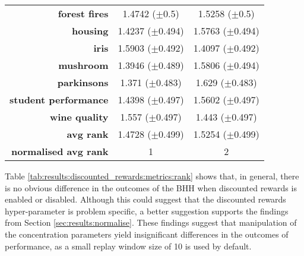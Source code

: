 \begin{table}[htb]
{\begin{tabular}{rcc}
                  \multicolumn{1}{r|}{\textbf{forest fires}}        & \cellcolor[rgb]{ .388,  .745,  .482}1.4742 ($\pm$0.5)          & \cellcolor[rgb]{ .973,  .412,  .42}1.5258 ($\pm$0.5)    \\
                  \multicolumn{1}{r|}{\textbf{housing}}             & \cellcolor[rgb]{ .388,  .745,  .482}1.4237 ($\pm$0.494)        & \cellcolor[rgb]{ .973,  .412,  .42}1.5763 ($\pm$0.494)  \\
                  \multicolumn{1}{r|}{\textbf{iris}}                & \cellcolor[rgb]{ .973,  .412,  .42}1.5903 ($\pm$0.492)         & \cellcolor[rgb]{ .388,  .745,  .482}1.4097 ($\pm$0.492) \\
                  \multicolumn{1}{r|}{\textbf{mushroom}}            & \cellcolor[rgb]{ .388,  .745,  .482}1.3946 ($\pm$0.489)        & \cellcolor[rgb]{ .973,  .412,  .42}1.5806 ($\pm$0.494)  \\
                  \multicolumn{1}{r|}{\textbf{parkinsons}}          & \cellcolor[rgb]{ .388,  .745,  .482}1.371 ($\pm$0.483)         & \cellcolor[rgb]{ .973,  .412,  .42}1.629 ($\pm$0.483)   \\
                  \multicolumn{1}{r|}{\textbf{student performance}} & \cellcolor[rgb]{ .388,  .745,  .482}1.4398 ($\pm$0.497)        & \cellcolor[rgb]{ .973,  .412,  .42}1.5602 ($\pm$0.497)  \\
                  \multicolumn{1}{r|}{\textbf{wine quality}}        & \cellcolor[rgb]{ .973,  .412,  .42}1.557 ($\pm$0.497)          & \cellcolor[rgb]{ .388,  .745,  .482}1.443 ($\pm$0.497)  \\
                  \midrule
                  \multicolumn{1}{r|}{\textbf{avg rank}}            & \cellcolor[rgb]{ .388,  .745,  .482}1.4728 ($\pm$0.499)        & \cellcolor[rgb]{ .973,  .412,  .42}1.5254 ($\pm$0.499)  \\
                  \midrule
                  \textbf{normalised avg rank}                      & \cellcolor[rgb]{ .388,  .745,  .482}1                          & \cellcolor[rgb]{ .973,  .412,  .42}2                    \\
            \end{tabular}%
      }
\end{table}%

Table \ref{tab:results:discounted_rewards:metrics:rank} shows that, in general, there is no obvious difference in the outcomes of the \acs{BHH} when discounted rewards is enabled or disabled. Although this could suggest that the discounted rewards hyper-parameter is problem specific, a better suggestion supports the findings from Section \ref{sec:results:normalise}. These findings suggest that manipulation of the concentration parameters yield insignificant differences in the outcomes of performance, as a small replay window size of 10 is used by default.

